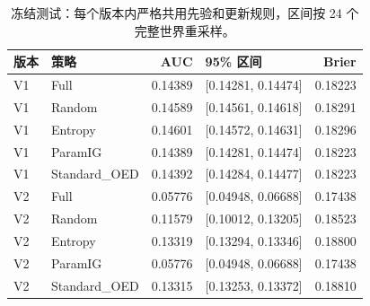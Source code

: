 \begin{table}[tbp]
\centering\small
\setlength{\tabcolsep}{4pt}
\caption{冻结测试：每个版本内严格共用先验和更新规则，区间按 24 个完整世界重采样。}\label{tab:v2-selectors}
\begin{tabular}{llrlr}
\toprule
版本 & 策略 & AUC & 95\% 区间 & Brier \\
\midrule
V1 & Full & 0.14389 & [0.14281, 0.14474] & 0.18223 \\
V1 & Random & 0.14589 & [0.14561, 0.14618] & 0.18291 \\
V1 & Entropy & 0.14601 & [0.14572, 0.14631] & 0.18296 \\
V1 & ParamIG & 0.14389 & [0.14281, 0.14474] & 0.18223 \\
V1 & Standard\_OED & 0.14392 & [0.14284, 0.14477] & 0.18223 \\
V2 & Full & 0.05776 & [0.04948, 0.06688] & 0.17438 \\
V2 & Random & 0.11579 & [0.10012, 0.13205] & 0.18523 \\
V2 & Entropy & 0.13319 & [0.13294, 0.13346] & 0.18800 \\
V2 & ParamIG & 0.05776 & [0.04948, 0.06688] & 0.17438 \\
V2 & Standard\_OED & 0.13315 & [0.13253, 0.13372] & 0.18810 \\
\bottomrule
\end{tabular}
\end{table}
